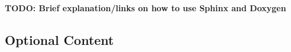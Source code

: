 \documentclass[12pt]{article}
\newcommand\red[1]{{\color{red}#1}}
\begin{document}
\red{\textbf{TODO: Brief explanation/links on how to use Sphinx and Doxygen}}


\subsection{Optional Content}
\end{document}
